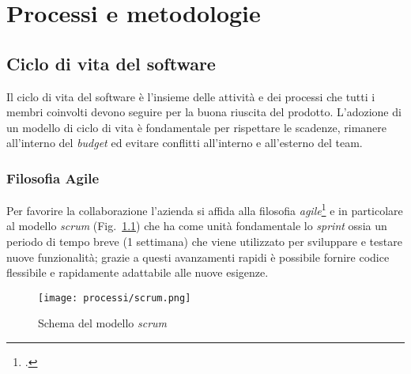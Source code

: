 \chapter{Processi e metodologie}
\label{cap:processi-metodologie}



\section{Ciclo di vita del software}
Il ciclo di vita del software è l'insieme delle attività e dei processi che tutti i membri coinvolti devono seguire per la buona riuscita del prodotto.
L'adozione di un modello di ciclo di vita è fondamentale per rispettare le scadenze, rimanere all'interno del \emph{budget} ed evitare conflitti all'interno e all'esterno del team.

\subsection{Filosofia Agile}
Per favorire la collaborazione l'azienda si affida alla filosofia \emph{agile}\footcite{site:agile} e in particolare al modello \emph{scrum} (Fig.~\ref{fig:schema-scrum}) che ha come unità fondamentale lo \emph{sprint} ossia un periodo di tempo breve (1 settimana) che viene utilizzato per sviluppare e testare nuove funzionalità; grazie a questi avanzamenti rapidi è possibile fornire codice flessibile e rapidamente adattabile alle nuove esigenze. 

\begin{figure}[!h] 
    \centering 
    \texttt{[image: processi/scrum.png]} 
    \caption{Schema del modello \emph{scrum}}
    \label{fig:schema-scrum}
  \end{figure}

\newpage

